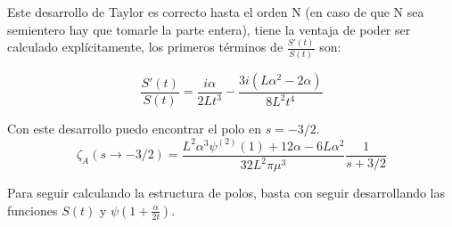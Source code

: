 Este desarrollo de Taylor es correcto hasta el orden N (en caso de que N sea semientero hay que tomarle la parte entera), tiene la ventaja de poder ser calculado explícitamente, los primeros términos de $\frac{S'(t)}{S(t)}$ son:

\begin{equation}
\frac{S'(t)}{S(t)} = 
\frac{i \alpha}{2 L t^3} -
\frac{3 i (L \alpha ^2 - 2 \alpha)}{8 L^2 t ^4}
\end{equation}




Con este desarrollo puedo encontrar el polo en $s=-3/2$.
\begin{equation}
\zeta _A (s \rightarrow -3/2) = 
\frac{L ^2 \alpha  ^3 \psi ^{(2)} (1) + 12   \alpha  - 6 L \alpha ^2}{32 L^2 \pi \mu ^3}
\frac{1}{s+3/2}
\end{equation}

Para seguir calculando la estructura de polos, basta con seguir desarrollando las funciones $S(t)$ y $\psi (1 + \frac{\alpha}{2 t})$.

